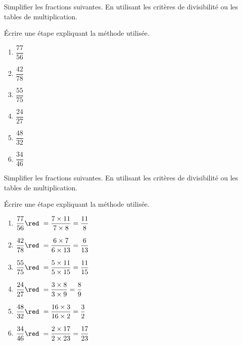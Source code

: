 \begin{exercice*}[Titre]
    Simplifier les fractions suivantes. En utilisant les critères de divisibilité ou les tables de multiplication.

    Écrire une étape expliquant la méthode utilisée.
    \begin{spacing}{1.5}
        \begin{multicols}{3}
            \begin{enumerate}
                \item $\dfrac{77}{56}$
                \item $\dfrac{42}{78}$
                \item $\dfrac{55}{75}$
                \item $\dfrac{24}{27}$
                \item $\dfrac{48}{32}$
                \item $\dfrac{34}{46}$
            \end{enumerate}            
        \end{multicols}        
    \end{spacing}
\end{exercice*}
\begin{corrige}
    Simplifier les fractions suivantes. En utilisant les critères de divisibilité ou les tables de multiplication.

    Écrire une étape expliquant la méthode utilisée.
    \begin{spacing}{1.5}
        \begin{multicols}{2}
            \begin{enumerate}
                \item $\dfrac{77}{56} {\red ~= \dfrac{7\times11}{7\times8} = \dfrac{11}{8}  }$
                \item $\dfrac{42}{78} {\red ~= \dfrac{6\times7}{6\times13} = \dfrac{6}{13}  }$
                \item $\dfrac{55}{75} {\red ~= \dfrac{5\times11}{5\times15} = \dfrac{11}{15}}$
                \item $\dfrac{24}{27} {\red ~= \dfrac{3\times8}{3\times9} = \dfrac{8}{9}    }$
                \item $\dfrac{48}{32} {\red ~= \dfrac{16\times3}{16\times2} = \dfrac{3}{2}  }$
                \item $\dfrac{34}{46} {\red ~= \dfrac{2\times17}{2\times23} = \dfrac{17}{23}}$
            \end{enumerate}            
        \end{multicols}        
    \end{spacing}

\end{corrige}

